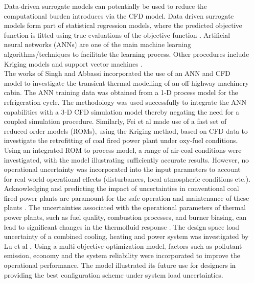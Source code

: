 \documentclass[a4paper,fleqn]{cas-dc}
\begin{document}
Data-driven surrogate models can potentially be used to reduce the computational burden introduces via the CFD model. Data driven surrogate models form part of statistical regression models, where the predicted objective function is fitted using true evaluations of the objective function \cite{Wheeler2019}. Artificial neural networks (ANNs) are one of the main machine learning algorithms/techniques to facilitate the learning process. Other procedures include Kriging models \cite{Fei2015} and support vector machines \cite{Lv2017}.\\

The works of Singh and Abbassi \cite{Singh2018} incorporated the use of an ANN and CFD model to investigate the transient thermal modelling of an off-highway machinery cabin. The ANN training data was obtained from a 1-D process model for the refrigeration cycle. The methodology was used successfully to integrate the ANN capabilities with a 3-D CFD simulation model thereby negating the need for a coupled simulation procedure. Similarly, Fei et al \cite{Fei2015} made use of a fast set of reduced order models (ROMs), using the Kriging method, based on CFD data to investigate the retrofitting of coal fired power plant under oxy-fuel conditions. Using an integrated ROM to process model, a range of air-coal conditions were investigated, with the model illustrating sufficiently accurate results. However, no operational uncertainty was incorporated into the input parameters to account for real world operational effects (disturbances, local atmospheric conditions etc.).\\

Acknowledging and predicting the impact of uncertainties in conventional coal fired power plants are paramount for the safe operation and maintenance of these plants \cite{Madejski_18}. The uncertainties associated with the operational parameters of thermal power plants, such as fuel quality, combustion processes, and  burner biasing, can lead to significant changes in the thermofluid response \cite{Sarkar2015}. The design space load uncertainty of a combined cooling, heating and power system was investigated by Lu et al \cite{Lu2021}. Using a multi-objective optimization model, factors such as pollutant emission, economy and the system reliability were incorporated to improve the operational performance. The model illustrated its future use for designers in providing the best configuration scheme under system load uncertainties.\\ 
\end{document}
